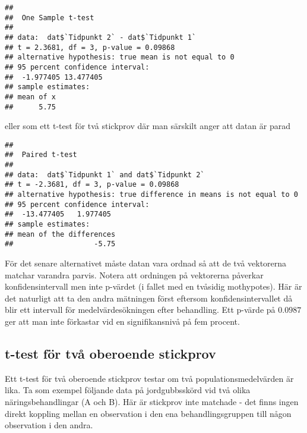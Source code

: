 \documentclass[
]{book}
\newenvironment{Shaded}{\begin{snugshade}}{\end{snugshade}}
\newcommand{\AttributeTok}[1]{\textcolor[rgb]{0.77,0.63,0.00}{#1}}
\newcommand{\FunctionTok}[1]{\textcolor[rgb]{0.00,0.00,0.00}{#1}}
\newcommand{\NormalTok}[1]{#1}
\newcommand{\SpecialCharTok}[1]{\textcolor[rgb]{0.00,0.00,0.00}{#1}}
\newcommand{\StringTok}[1]{\textcolor[rgb]{0.31,0.60,0.02}{#1}}
\theoremstyle{definition}
\theoremstyle{definition}
\theoremstyle{definition}
\theoremstyle{definition}
\theoremstyle{remark}
\begin{document}
\begin{verbatim}
## 
##  One Sample t-test
## 
## data:  dat$`Tidpunkt 2` - dat$`Tidpunkt 1`
## t = 2.3681, df = 3, p-value = 0.09868
## alternative hypothesis: true mean is not equal to 0
## 95 percent confidence interval:
##  -1.977405 13.477405
## sample estimates:
## mean of x 
##      5.75
\end{verbatim}

eller som ett t-test för två stickprov där man särskilt anger att datan är parad

\begin{Shaded}
\end{Shaded}

\begin{verbatim}
## 
##  Paired t-test
## 
## data:  dat$`Tidpunkt 1` and dat$`Tidpunkt 2`
## t = -2.3681, df = 3, p-value = 0.09868
## alternative hypothesis: true difference in means is not equal to 0
## 95 percent confidence interval:
##  -13.477405   1.977405
## sample estimates:
## mean of the differences 
##                   -5.75
\end{verbatim}

För det senare alternativet måste datan vara ordnad så att de två vektorerna matchar varandra parvis. Notera att ordningen på vektorerna påverkar konfidensintervall men inte p-värdet (i fallet med en tvåsidig mothypotes). Här är det naturligt att ta den andra mätningen först eftersom konfidensintervallet då blir ett intervall för medelvärdesökningen efter behandling. Ett p-värde på \(0.0987\) ger att man inte förkastar vid en signifikansnivå på fem procent.

\hypertarget{t-test-fuxf6r-tvuxe5-oberoende-stickprov}{%
\subsection{t-test för två oberoende stickprov}\label{t-test-fuxf6r-tvuxe5-oberoende-stickprov}}

Ett t-test för två oberoende stickprov testar om två populationsmedelvärden är lika. Ta som exempel följande data på jordgubbsskörd vid två olika näringsbehandlingar (A och B). Här är stickprov inte matchade - det finns ingen direkt koppling mellan en observation i den ena behandlingsgruppen till någon observation i den andra.
\end{document}
